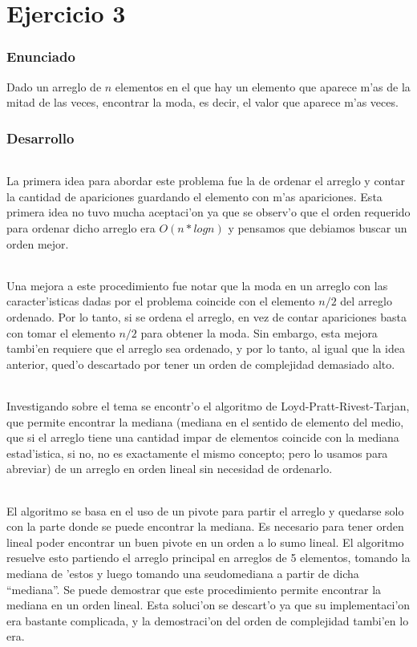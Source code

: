 \part{Ejercicio 3}
\section{Enunciado}
Dado un arreglo de $n$ elementos en el que hay un elemento que aparece m'as de la mitad de las 
veces, encontrar la moda, es decir, el valor que aparece m'as veces.

\section{Desarrollo}
\paragraph{}
La primera idea para abordar este problema fue la de ordenar el arreglo y contar la cantidad 
de apariciones guardando el elemento con m'as apariciones. Esta primera idea no tuvo mucha 
aceptaci'on ya que se observ'o que el orden requerido para ordenar dicho arreglo era $O(n*log n)$ y pensamos que debiamos buscar un orden mejor.
\paragraph{}
Una mejora a este procedimiento fue notar que la moda en un arreglo con las caracter'isticas
dadas por el problema coincide con el elemento $n/2$ del arreglo ordenado. Por lo tanto, 
si se ordena el arreglo, en vez de contar apariciones basta con tomar el elemento $n/2$ para 
obtener la moda. Sin embargo, esta mejora tambi'en requiere que el arreglo sea ordenado, y por
lo tanto, al igual que la idea anterior, qued'o descartado por tener un orden de complejidad
demasiado alto.
\paragraph{}
Investigando sobre el tema se encontr'o el algoritmo de Loyd-Pratt-Rivest-Tarjan, que permite 
encontrar la mediana (mediana en el sentido de elemento del medio, que si el arreglo tiene una 
cantidad impar de elementos coincide con la mediana estad'istica, si no, no es exactamente el 
mismo concepto; pero lo usamos para abreviar) de un arreglo en orden lineal sin necesidad de ordenarlo.
\paragraph{}
El algoritmo se basa en el uso de un pivote para partir el arreglo y quedarse solo con la parte donde se 
puede encontrar la mediana. Es necesario para tener orden lineal poder encontrar un buen pivote 
en un orden a lo sumo lineal. El algoritmo resuelve esto partiendo el arreglo principal en arreglos
de 5 elementos, tomando la mediana de 'estos y luego tomando una seudomediana a partir de dicha ``mediana''. 
Se puede demostrar que este procedimiento permite encontrar la mediana en un orden lineal. Esta 
soluci'on se descart'o ya que su implementaci'on era bastante complicada, y la demostraci'on del orden de complejidad tambi'en lo era.
